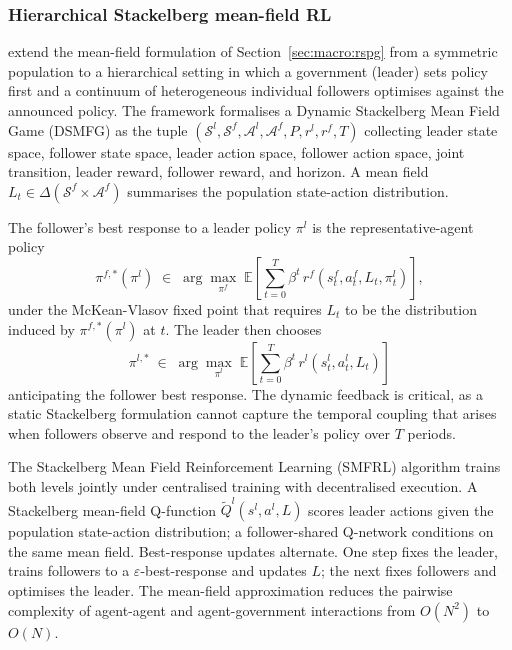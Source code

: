 \subsubsection{Hierarchical Stackelberg mean-field RL}
\label{sec:macro:dsmfg}

\citet{Mi2025dsmfg} extend the mean-field formulation of
Section~\ref{sec:macro:rspg} from a symmetric population to a
hierarchical setting in which a government (leader) sets policy
first and a continuum of heterogeneous individual followers
optimises against the announced policy. The framework formalises a
Dynamic Stackelberg Mean Field Game (DSMFG) as the tuple
$(\mathcal S^l, \mathcal S^f, \mathcal A^l, \mathcal A^f, P, r^l,
r^f, T)$ collecting leader state space, follower state space, leader
action space, follower action space, joint transition, leader
reward, follower reward, and horizon. A mean field
$L_t \in \Delta(\mathcal S^f \times \mathcal A^f)$ summarises the
population state-action distribution.

The follower's best response to a leader policy $\pi^l$ is the
representative-agent policy
\begin{equation}
\pi^{f,*}(\pi^l) \;\in\; \arg\max_{\pi^f}\;
\mathbb E\!\left[\sum_{t=0}^{T} \beta^t\, r^f(s^f_t, a^f_t, L_t,
\pi^l_t)\right],
\label{eq:macro:dsmfg-follower}
\end{equation}
under the McKean-Vlasov fixed point that requires $L_t$ to be the
distribution induced by $\pi^{f,*}(\pi^l)$ at $t$. The leader then
chooses
\begin{equation}
\pi^{l,*} \;\in\; \arg\max_{\pi^l}\;
\mathbb E\!\left[\sum_{t=0}^{T} \beta^t\, r^l(s^l_t, a^l_t, L_t)\right]
\label{eq:macro:dsmfg-leader}
\end{equation}
anticipating the follower best response. The dynamic feedback is
critical, as a static Stackelberg formulation cannot capture the
temporal coupling that arises when followers observe and respond to
the leader's policy over $T$ periods.

The Stackelberg Mean Field Reinforcement Learning (SMFRL) algorithm
trains both levels jointly under centralised training with
decentralised execution. A Stackelberg mean-field Q-function
$\widetilde Q^l(s^l, a^l, L)$ scores leader actions given the
population state-action distribution; a follower-shared Q-network
conditions on the same mean field. Best-response updates alternate.
One step fixes the leader, trains followers to a $\varepsilon$-best-response and
updates $L$; the next fixes followers and optimises the leader. The mean-field
approximation reduces the pairwise complexity of agent-agent and
agent-government interactions from $O(N^2)$ to $O(N)$.

